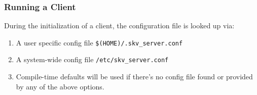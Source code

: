 \subsubsection{Running a Client}\label{sec:skv:run:client}
During the initialization of a client, the configuration file is
looked up via:
\begin{enumerate}
\item A user specific config file \verb|$(HOME)/.skv_server.conf|
\item A system-wide config file \verb|/etc/skv_server.conf|
\item Compile-time defaults will be used if there's no config file
  found or provided by any of the above options.
\end{enumerate}




\endinput



